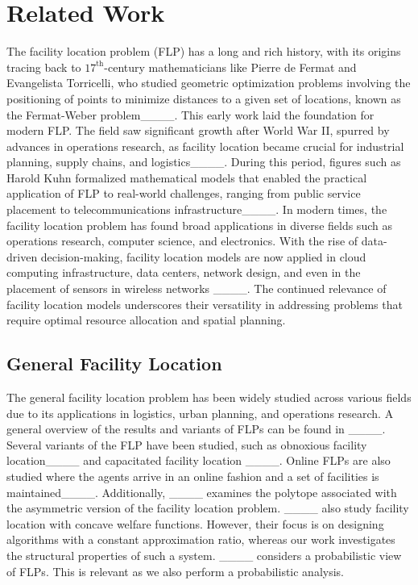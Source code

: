 \section{Related Work}
The facility location problem (FLP) has a long and rich history, with its origins tracing back to $17^{\text{th}}$-century mathematicians like Pierre de Fermat and Evangelista Torricelli, who studied geometric optimization problems involving the positioning of points to minimize distances to a given set of locations, known as the Fermat-Weber problem____. This early work laid the foundation for modern FLP. The field saw significant growth after World War II, spurred by advances in operations research, as facility location became crucial for industrial planning, supply chains, and logistics____. During this period, figures such as Harold Kuhn formalized mathematical models that enabled the practical application of FLP to real-world challenges, ranging from public service placement to telecommunications infrastructure____.
In modern times, the facility location problem has found broad applications in diverse fields such as operations research, computer science, and electronics. With the rise of data-driven decision-making, facility location models are now applied in cloud computing infrastructure, data centers, network design, and even in the placement of sensors in wireless networks ____. The continued relevance of facility location models underscores their versatility in addressing problems that require optimal resource allocation and spatial planning.


\subsection{General Facility Location}
The general facility location problem has been widely studied across various fields due to its applications in logistics, urban planning, and operations research. 
A general overview of the results and variants of FLPs can be found in ____. Several variants of the FLP have been studied, such as obnoxious facility location____ and capacitated facility location ____. Online FLPs are also studied where the agents arrive in an online fashion and a set of facilities is maintained____.
Additionally, ____ examines the polytope associated with the asymmetric version of the facility location problem. 
____ also study facility location with concave welfare functions. However, their focus is on designing algorithms with a constant approximation ratio, whereas our work investigates the structural properties of such a system. ____ considers a probabilistic view of FLPs. This is relevant as we also perform a probabilistic analysis.

